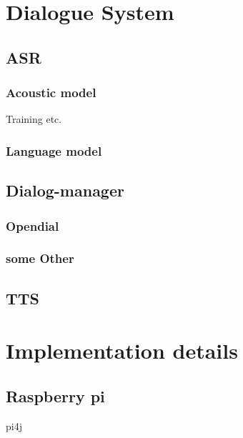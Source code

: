 \documentclass[a4paper, 12pt]{article}
\begin{document}


\pagestyle{empty}

\pagestyle{plain}
\setcounter{page}{1}


\section{Dialogue System}

\subsection{ASR}

\subsubsection{Acoustic model}
Training etc.

\subsubsection{Language model}

%

\subsection{Dialog-manager}

\subsubsection{Opendial}

\subsubsection{some Other}

\subsection{TTS}

\section{Implementation details}
\subsection{Raspberry pi}
pi4j
\end{document}
